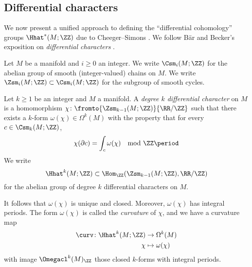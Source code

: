 
\subsection{Differential characters}

We now present a unified approach to defining the ``differential cohomology'' groups $ \Hhat^{*}(M;\ZZ) $ due to Cheeger--Simons \cite{MR827262}.
We follow Bär and Becker's exposition on \textit{differential characters} \cite[Part I, \S5]{MR3237728}.

\begin{notation}
	Let $ M $ be a manifold and $ i \geq 0 $ an integer.
	We write $ \Csm_i(M;\ZZ) $ for the abelian group of smooth (integer-valued) chains on $ M $.
	We write $ \Zsm_i(M;\ZZ) \subset \Csm_i(M;\ZZ) $ for the subgroup of smooth cycles.
\end{notation}

\begin{definition}
	Let $ k \geq 1 $ be an integer and $ M $ a manifold.
	A \emph{degree $ k $ differential character} on $ M $ is a homomorphism $ \chi \colon \fromto{\Zsm_{k-1}(M;\ZZ)}{\RR/\ZZ} $ such that there exists a $ k $-form $ \omega(\chi) \in \Omega^k(M) $ with the property that for every $ c \in \Csm_k(M;\ZZ) $, 
	\begin{equation*}
		\chi(\partial c) = \int_c \omega(\chi) \quad \text{mod } \ZZ \period
	\end{equation*} 
	We write
	\begin{equation*}
		\Hhat^k(M;\ZZ) \subset \Hom_{\ZZ}(\Zsm_{k-1}(M;\ZZ),\RR/\ZZ)
	\end{equation*}
	for the abelian group of degree $ k $ differential characters on $ M $.
	
	It follows that $ \omega(\chi) $ is unique and closed.
	Moreover, $ \omega(\chi) $ has integral periods.
	The form $ \omega(\chi) $ is called the \emph{curvature} of $ \chi $, and we have a curvature map
	\begin{align*}
		\curv \colon \Hhat^k(M;\ZZ) &\to \Omega^k(M) \\
		\chi &\mapsto \omega(\chi)
	\end{align*} 
	with image $ \Omegacl^k(M)_{\ZZ} $ those closed $ k $-forms with integral periods.
\end{definition}

